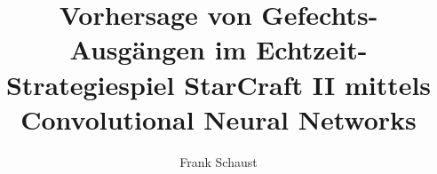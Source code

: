 \documentclass[m,bachelor,binding,twoside,palatino]{WeSTthesis}
\begin{document}
\title{\textbf{Vorhersage von Gefechts-Ausgängen im Echtzeit-Strategiespiel StarCraft II mittels Convolutional Neural Networks}}

\author{Frank Schaust}



\secondreviewer{}

\maketitle








\printbibliography
\end{document}
